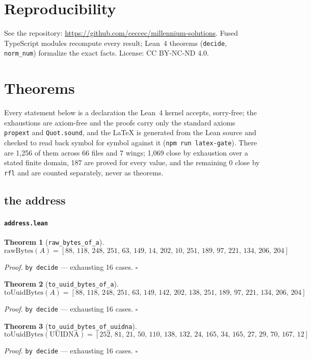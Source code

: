 \documentclass[11pt]{article}
\newtheorem{theorem}{Theorem}[section]
\begin{document}
\section{Reproducibility}
See the repository: \url{https://github.com/ceccec/millennium-solutions}. Fused
TypeScript modules recompute every result; Lean~4 theorems (\texttt{decide},
\texttt{norm\_num}) formalize the exact facts. License: CC BY-NC-ND 4.0.

\section{Theorems}

Every statement below is a declaration the Lean~4 kernel accepts, sorry-free; the exhaustions are axiom-free and the
proofs carry only the standard axioms \texttt{propext} and \texttt{Quot.sound}, and the
\LaTeX{} is generated from the Lean source and checked to read back symbol for symbol against it
(\texttt{npm run latex-gate}). There are 1,256 of them across 66 files and
7 wings; 1,069 close by exhaustion over a stated finite domain, 187 are proved
for every value, and the remaining 0 close by \texttt{rfl} and are counted separately, never as theorems.

\subsection{the address}

\paragraph{\texttt{address.lean}}

\begin{theorem}[\texttt{raw\_bytes\_of\_a}]
\[ \mathrm{rawBytes}\mathopen{}\left(A\right) = [88,\,118,\,248,\,251,\,63,\,149,\,14,\,202,\,10,\,251,\,189,\,97,\,221,\,134,\,206,\,204] \]
\end{theorem}
\noindent\emph{Proof.} \texttt{by decide} --- exhausting 16 cases. \hfill$\square$

\begin{theorem}[\texttt{to\_uuid\_bytes\_of\_a}]
\[ \mathrm{toUuidBytes}\mathopen{}\left(A\right) = [88,\,118,\,248,\,251,\,63,\,149,\,142,\,202,\,138,\,251,\,189,\,97,\,221,\,134,\,206,\,204] \]
\end{theorem}
\noindent\emph{Proof.} \texttt{by decide} --- exhausting 16 cases. \hfill$\square$

\begin{theorem}[\texttt{to\_uuid\_bytes\_of\_uuidna}]
\[ \mathrm{toUuidBytes}\mathopen{}\left(\mathrm{UUIDNA}\right) = [252,\,81,\,21,\,50,\,110,\,138,\,132,\,24,\,165,\,34,\,165,\,27,\,29,\,70,\,167,\,12] \]
\end{theorem}
\noindent\emph{Proof.} \texttt{by decide} --- exhausting 16 cases. \hfill$\square$
\end{document}
